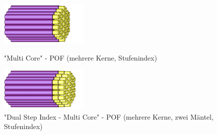 \begin{figure}[h]
    \begin{center}
        \begin{minipage}[t]{0.4\textwidth}
            \begin{center}
                \includegraphics[height=0.1\textheight]{Bilder/Optische_Wellenleiter_Die_polymer_optische_Faser/Brechzahlprofile/pofmc.png}
                \caption["Multi
                Core" - POF (mehrere Kerne, Stufenindex) \newline
                \url{POFAC}]{"Multi
                Core" - POF (mehrere Kerne, Stufenindex)}
                \label{fig:pofmc}
            \end{center}
        \end{minipage}
        \hspace{0.025\textwidth}
        \begin{minipage}[t]{0.4\textwidth}
            \begin{center}
                \includegraphics[height=0.1\textheight]{Bilder/Optische_Wellenleiter_Die_polymer_optische_Faser/Brechzahlprofile/pofdsimc.png}
                \caption["Dual
                Step Index - Multi Core" - POF (mehrere Kerne,
                zwei Mäntel, Stufenindex) \newline
                \url{POFAC}]{"Dual
                Step Index - Multi Core" - POF (mehrere Kerne,
                zwei Mäntel, Stufenindex)}
                \label{fig:pofdsimc}
            \end{center}
        \end{minipage}
    \end{center}
\end{figure}

